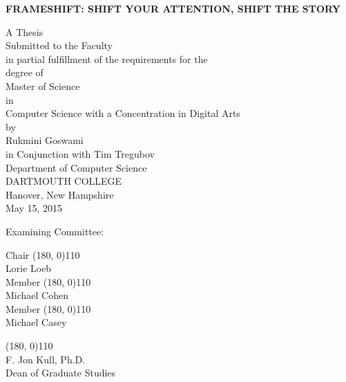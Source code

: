 \pagestyle{plain}
\begin{center}
\textbf{FRAMESHIFT: SHIFT YOUR ATTENTION, SHIFT THE STORY}
\vspace{0.4cm}

A Thesis\\ [0.4cm]
Submitted to the Faculty \\ [0.4cm]
in partial fulfillment of the requirements for the \\[0.4cm]
degree of \\[0.4cm]
Master of Science\\in\\Computer Science with a Concentration in Digital Arts\\[0.4cm]
by\\[0.5cm]
Rukmini Goswami\\[0.4cm]
in Conjunction with Tim Tregubov \\[0.5cm]
Department of Computer Science \\ [0.4cm]
DARTMOUTH COLLEGE \\ [0.4cm]
Hanover, New Hampshire \\[0.4cm]
May 15, 2015 %
\vspace{1.5cm}

\end{center}

Examining Committee:

\begin{flushright}
Chair \line(180, 0){110} \\
Lorie Loeb\\[1cm]

Member \line(180, 0){110} \\
Michael Cohen \\[1cm]

Member \line(180, 0){110} \\
Michael Casey \\[1cm]



\end{flushright}

\begin{flushleft}
\line(180, 0){110} \\
F. Jon Kull, Ph.D.\\
Dean of Graduate Studies\\[1cm]
\end{flushleft}






